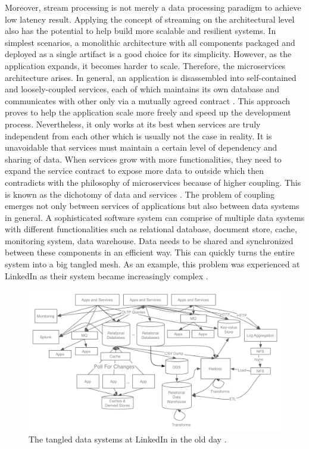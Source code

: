 Moreover, stream processing is not merely a data processing paradigm to achieve low latency result. Applying the concept of streaming on the architectural level also has the potential to help build more scalable and resilient systems. In simplest scenarios, a monolithic architecture with all components packaged and deployed as a single artifact is a good choice for its simplicity. However, as the application expands, it becomes harder to scale. Therefore, the microservices architecture arises. In general, an application is disassembled into self-contained and loosely-coupled services, each of which maintains its own database and communicates with other only via a mutually agreed contract \cite{microservices}. This approach proves to help the application scale more freely and speed up the development process. Nevertheless, it only works at its best when services are truly independent from each other which is usually not the case in reality. It is unavoidable that services must maintain a certain level of dependency and sharing of data. When services grow with more functionalities, they need to expand the service contract to expose more data to outside which then contradicts with the philosophy of microservices because of higher coupling. This is known as the dichotomy of data and services \cite{stopford2018designing}. The problem of coupling emerges not only between services of applications but also between data systems in general. A sophisticated software system can comprise of multiple data systems with different functionalities such as relational database, document store, cache, monitoring system, data warehouse. Data needs to be shared and synchronized between these components in an efficient way. This can quickly turns the entire system into a big tangled mesh. As an example, this problem was experienced at LinkedIn as their system became increasingly complex \cite{eventstreamingplatform}. 

\begin{figure}[h]
	\includegraphics[width=\linewidth]{images/linkedin-data-flow-ugly.png}
	\caption{The tangled data systems at LinkedIn in the old day \cite{eventstreamingplatform}.}
	\label{fig:tangledsystem}
\end{figure}

